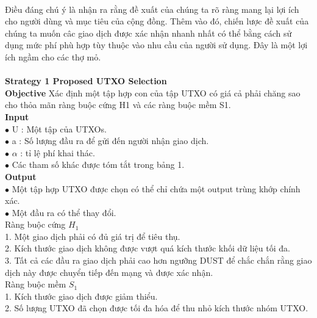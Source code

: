 \documentclass[a4paper]{article}
\begin{document}
\\Điều đáng chú ý là nhận ra rằng đề xuất của chúng ta rõ ràng mang lại lợi ích cho người dùng và mục tiêu của cộng đồng. Thêm vào đó, chiến lược đề xuất của chúng ta muốn câc giao dịch được xác nhận nhanh nhất có thể bằng cách sử dụng mức phí phù hợp tùy thuộc vào nhu cầu của người sử dụng. Đây là một lợi ích ngầm cho các thợ mỏ.
\\
\\\textbf{Strategy 1 Proposed UTXO Selection}
\\\textbf{Objective} Xác định một tập hợp con của tập UTXO có giá cả phải chăng sao cho thỏa mãn ràng buộc cứng H1 và các ràng buộc mềm S1.
\\\textbf{Input} 
\\$\bullet$ U : Một tập của UTXOs.
\\$\bullet$ a : Số lượng đầu ra để gửi đến người nhận giao dịch.
\\$\bullet$ $\alpha$ : tỉ lệ phí khai thác.
\\$\bullet$ Các tham số khác được tóm tắt trong bảng 1.
\\\textbf{Output}
\\$\bullet$ Một tập hợp UTXO được chọn có thể chỉ chứa một output trùng khớp chính xác.
\\$\bullet$ Một đầu ra có thể thay đổi.
\\Ràng buộc cứng $H_1$
\\1. Một giao dịch phải có đủ giá trị để tiêu thụ.
\\2. Kích thước giao dịch không được vượt quá kích thước khối dữ liệu tối đa.
\\3. Tất cả các đầu ra giao dịch phải cao hơn ngưỡng DUST để chắc chắn rằng giao dịch này được chuyển tiếp đến mạng và được xác nhận.
\\Ràng buộc mềm $S_1$
\\1. Kích thước giao dịch được giảm thiểu.
\\2. Số lượng UTXO đã chọn được tối đa hóa để thu nhỏ kích thước nhóm UTXO.
\\
\\
\\
\end{document}
